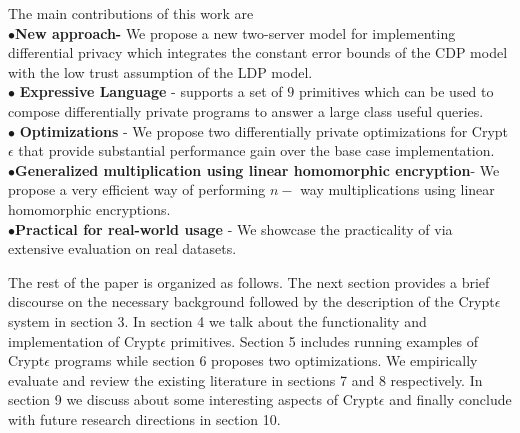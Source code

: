 The main contributions of this work are\\
$\bullet$\textbf{New approach-} We propose a new two-server model for implementing differential privacy which integrates the constant error bounds of the \textsf{CDP} model with the low trust assumption of the \textsf{LDP} model. \\
$\bullet$ \textbf{Expressive Language} - \system supports a set of $9$ primitives which can be used to compose differentially private programs to answer a large class useful queries. \\
$\bullet$ \textbf{Optimizations} - We propose two differentially private optimizations  for Crypt$\epsilon$ that provide substantial performance gain over the base case implementation.\\
$\bullet $\textbf{Generalized multiplication using linear homomorphic encryption}- We propose a very efficient way of performing $n-$ way multiplications using linear homomorphic encryptions.\\
$\bullet $\textbf{Practical for real-world usage} -  We showcase the practicality of \system via extensive evaluation on real datasets.  

\par The rest of the paper is organized as follows. The next section provides a brief discourse on the necessary background followed by the description of the Crypt$\epsilon$ system in section 3. In section 4 we talk about the functionality and implementation of Crypt$\epsilon$ primitives. Section 5 includes running examples of Crypt$\epsilon$ programs while section 6 proposes two optimizations. We empirically evaluate \system and  review the existing literature in sections 7 and 8 respectively. In section 9 we discuss about some interesting aspects of Crypt$\epsilon$ and finally conclude with future research directions in section 10. 



